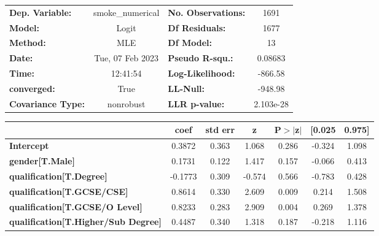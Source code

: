 \begin{center}
\begin{tabular}{lclc}
\toprule
\textbf{Dep. Variable:}                     & smoke\_numerical & \textbf{  No. Observations:  } &     1691    \\
\textbf{Model:}                             &      Logit       & \textbf{  Df Residuals:      } &     1677    \\
\textbf{Method:}                            &       MLE        & \textbf{  Df Model:          } &       13    \\
\textbf{Date:}                              & Tue, 07 Feb 2023 & \textbf{  Pseudo R-squ.:     } &  0.08683    \\
\textbf{Time:}                              &     12:41:54     & \textbf{  Log-Likelihood:    } &   -866.58   \\
\textbf{converged:}                         &       True       & \textbf{  LL-Null:           } &   -948.98   \\
\textbf{Covariance Type:}                   &    nonrobust     & \textbf{  LLR p-value:       } & 2.103e-28   \\
\bottomrule
\end{tabular}
\begin{tabular}{lcccccc}
                                            & \textbf{coef} & \textbf{std err} & \textbf{z} & \textbf{P$> |$z$|$} & \textbf{[0.025} & \textbf{0.975]}  \\
\midrule
\textbf{Intercept}                          &       0.3872  &        0.363     &     1.068  &         0.286        &       -0.324    &        1.098     \\
\textbf{gender[T.Male]}                     &       0.1731  &        0.122     &     1.417  &         0.157        &       -0.066    &        0.413     \\
\textbf{qualification[T.Degree]}            &      -0.1773  &        0.309     &    -0.574  &         0.566        &       -0.783    &        0.428     \\
\textbf{qualification[T.GCSE/CSE]}          &       0.8614  &        0.330     &     2.609  &         0.009        &        0.214    &        1.508     \\
\textbf{qualification[T.GCSE/O Level]}      &       0.8233  &        0.283     &     2.909  &         0.004        &        0.269    &        1.378     \\
\textbf{qualification[T.Higher/Sub Degree]} &       0.4487  &        0.340     &     1.318  &         0.187        &       -0.218    &        1.116     \\

\end{tabular}
\end{center}

